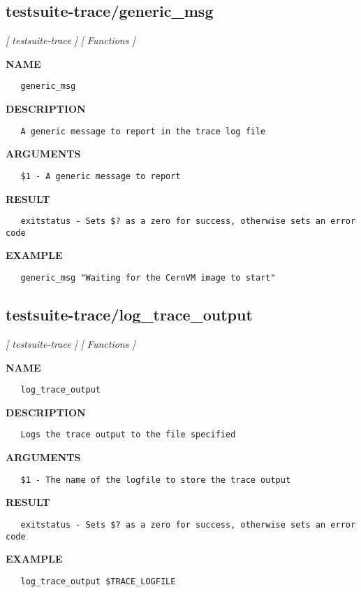 \subsection{testsuite-trace/generic\_msg}
\textsl{[ testsuite-trace ]}
\textsl{[ Functions ]}

\label{ch:robo54}
\label{ch:testsuite_trace_generic_msg}
\textbf{NAME}
\begin{verbatim}
   generic_msg
\end{verbatim}
\textbf{DESCRIPTION}
\begin{verbatim}
   A generic message to report in the trace log file
\end{verbatim}
\textbf{ARGUMENTS}
\begin{verbatim}
   $1 - A generic message to report
\end{verbatim}
\textbf{RESULT}
\begin{verbatim}
   exitstatus - Sets $? as a zero for success, otherwise sets an error code
\end{verbatim}
\textbf{EXAMPLE}
\begin{verbatim}
   generic_msg "Waiting for the CernVM image to start"
\end{verbatim}
\newpage
\subsection{testsuite-trace/log\_trace\_output}
\textsl{[ testsuite-trace ]}
\textsl{[ Functions ]}

\label{ch:robo55}
\label{ch:testsuite_trace_log_trace_output}
\textbf{NAME}
\begin{verbatim}
   log_trace_output
\end{verbatim}
\textbf{DESCRIPTION}
\begin{verbatim}
   Logs the trace output to the file specified
\end{verbatim}
\textbf{ARGUMENTS}
\begin{verbatim}
   $1 - The name of the logfile to store the trace output
\end{verbatim}
\textbf{RESULT}
\begin{verbatim}
   exitstatus - Sets $? as a zero for success, otherwise sets an error code
\end{verbatim}
\textbf{EXAMPLE}
\begin{verbatim}
   log_trace_output $TRACE_LOGFILE
\end{verbatim}
\newpage
